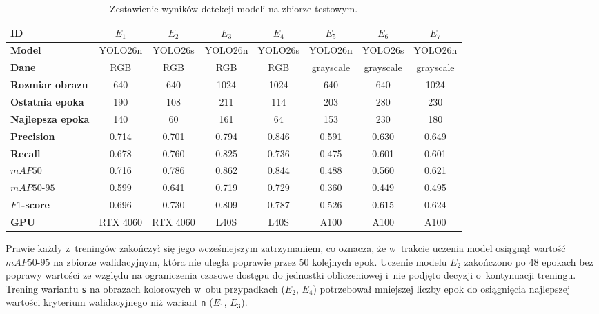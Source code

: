 \begin{table}[ht]
    \centering
    \footnotesize
    \caption{Zestawienie wyników detekcji modeli na zbiorze testowym.}
    \label{tab:results}
    \begin{tabular}{l|ccccccc}
        \toprule
        \textbf{ID}              & $E_1$    & $E_2$    & $E_3$   & $E_4$   & $E_5$     & $E_6$     & $E_7$     \\
        \midrule
        \textbf{Model}           & YOLO26n  & YOLO26s  & YOLO26n & YOLO26s & YOLO26n   & YOLO26s   & YOLO26n   \\
        \textbf{Dane}            & RGB      & RGB      & RGB     & RGB     & grayscale & grayscale & grayscale \\
        \textbf{Rozmiar obrazu}  & 640      & 640      & 1024    & 1024    & 640       & 640       & 1024      \\
        \textbf{Ostatnia epoka}  & 190      & 108      & 211     & 114     & 203       & 280       & 230       \\
        \textbf{Najlepsza epoka} & 140      & 60       & 161     & 64      & 153       & 230       & 180       \\
        \midrule
        \textbf{Precision}       & 0.714    & 0.701    & 0.794   & 0.846   & 0.591     & 0.630     & 0.649     \\
        \textbf{Recall}          & 0.678    & 0.760    & 0.825   & 0.736   & 0.475     & 0.601     & 0.601     \\
        $mAP50$                  & 0.716    & 0.786    & 0.862   & 0.844   & 0.488     & 0.560     & 0.621     \\
        $mAP50\text{-}95$        & 0.599    & 0.641    & 0.719   & 0.729   & 0.360     & 0.449     & 0.495     \\
        \textbf{$F1$-score}      & 0.696    & 0.730    & 0.809   & 0.787   & 0.526     & 0.615     & 0.624     \\
        \midrule
        \textbf{GPU}             & RTX 4060 & RTX 4060 & L40S    & L40S    & A100      & A100      & A100      \\
        \bottomrule
    \end{tabular}
\end{table}

Prawie każdy z~treningów zakończył się jego wcześniejszym zatrzymaniem, co oznacza, że w~trakcie uczenia model osiągnął wartość $mAP50\text{-}95$ na zbiorze walidacyjnym, która nie uległa poprawie przez 50 kolejnych epok. Uczenie modelu $E_2$ zakończono po 48 epokach bez poprawy wartości ze względu na ograniczenia czasowe dostępu do jednostki obliczeniowej i~nie podjęto decyzji o~kontynuacji treningu. Trening wariantu \texttt{s} na obrazach kolorowych w~obu przypadkach ($E_2$, $E_4$) potrzebował mniejszej liczby epok do osiągnięcia najlepszej wartości kryterium walidacyjnego niż wariant \texttt{n} ($E_1$, $E_3$).

